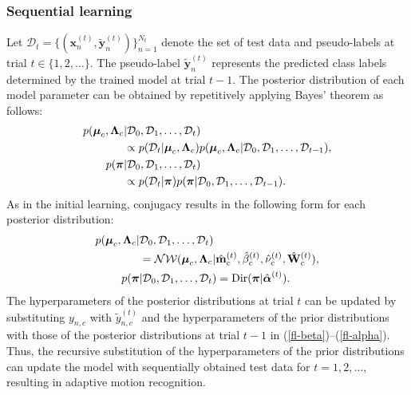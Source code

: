 \documentclass[letterpaper, 10 pt, conference]{ieeeconf}
\begin{document}
\subsubsection{Sequential learning}
Let $\mathcal{D}_{t}=\{(\mathbf{x}^{(t)}_n, \tilde{\mathbf{y}}^{(t)}_n)\}_{n=1}^{N_{t}}$ denote the set of test data and pseudo-labels at trial $t \in \{1, 2, \ldots\}$. 
The pseudo-label $\tilde{\mathbf{y}}^{(t)}_{n}$ represents the predicted class labels determined by the trained model at trial $t-1$. The posterior distribution of each model parameter can be obtained by repetitively applying Bayes' theorem as follows:
\begin{align}
    p(\boldsymbol{\mu}_{c}, \boldsymbol{\Lambda}_{c} &| \mathcal{D}_{0}, \mathcal{D}_{1}, \ldots, \mathcal{D}_{t})\notag \\
    &\propto p(\mathcal{D}_{t} | \boldsymbol{\mu}_{c}, \boldsymbol{\Lambda}_{c})p(\boldsymbol{\mu}_{c}, \boldsymbol{\Lambda}_{c} | \mathcal{D}_{0}, \mathcal{D}_{1},\ldots, \mathcal{D}_{{t-1}}),\\
    p(\boldsymbol{\pi} &| \mathcal{D}_{0}, \mathcal{D}_{1},\ldots, \mathcal{D}_{t})\notag \\
    &\propto p(\mathcal{D}_{t} | \boldsymbol{\pi})p(\boldsymbol{\pi} | \mathcal{D}_{0}, \mathcal{D}_{1},\ldots, \mathcal{D}_{{t-1}}).
\end{align}
As in the initial learning, conjugacy results in the following form for each posterior distribution:
\begin{align}
    p(\boldsymbol{\mu}_{c}, \boldsymbol{\Lambda}_{c} |& \mathcal{D}_{0}, \mathcal{D}_{1},\ldots, \mathcal{D}_{t})\notag\\
     &= \mathcal{NW}(\boldsymbol{\mu}_{c}, \boldsymbol{\Lambda}_{c} | \hat{\mathbf{m}}^{(t)}_{c}, \hat{\beta}^{(t)}_{c}, \hat{\nu}^{(t)}_{c}, \hat{\mathbf{W}}^{(t)}_{c}),\\
     p(\boldsymbol{\pi} &| \mathcal{D}_{0}, \mathcal{D}_{1},\ldots, \mathcal{D}_{t}) = \mathrm{Dir}(\boldsymbol{\pi} | \hat{\boldsymbol{\alpha}}^{(t)}).
\end{align}
The hyperparameters of the posterior distributions at trial $t$ can be updated by substituting $y_{n,c}$ with $\tilde{y}^{(t)}_{n,c}$ and the hyperparameters of the prior distributions with those of the posterior distributions at trial $t-1$ in (\ref{fl-beta})--(\ref{fl-alpha}). 
Thus, the recursive substitution of the hyperparameters of the prior distributions can update the model with sequentially obtained test data for $t = 1, 2, \ldots$, resulting in adaptive motion recognition.
\end{document}
